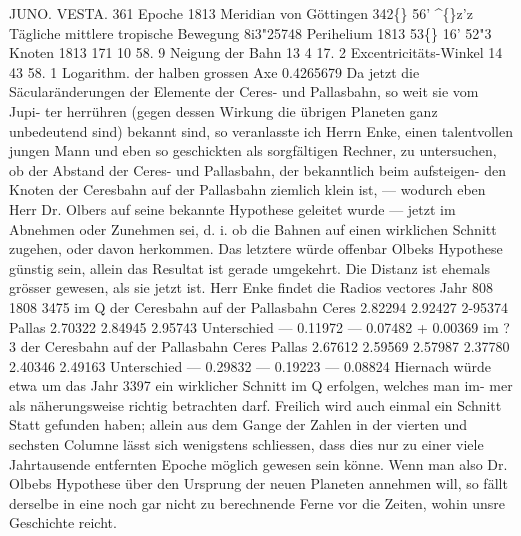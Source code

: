 \documentclass[12pt,a4paper]{article}
\newcommand{\degree}{\textdegree}
\begin{document}
\newpage
JUNO.      VESTA. 
361 
Epoche  1813  Meridian  von  Göttingen    342\degree\{\}  56'    \textasciicircum\{\}z'z 
Tägliche  mittlere  tropische  Bewegung    8i3"25748 
Perihelium  1813       
  53\degree\{\}  16'    52"3 
Knoten  1813    171     10    58. 9 
Neigung  der  Bahn    13      4     17. 2 
Excentricitäts-Winkel    14    43     58. 1 
Logarithm.  der  halben  grossen  Axe    0.4265679 
Da  jetzt  die  Säcularänderungen  der  Elemente  der  Ceres-  und  Pallasbahn,  so  weit  sie  vom  Jupi- 
ter herrühren  (gegen  dessen  Wirkung  die  übrigen  Planeten  ganz  unbedeutend  sind)  bekannt  sind,  so 
veranlasste  ich  Herrn  Enke,  einen  talentvollen  jungen  Mann  und  eben  so  geschickten  als  sorgfältigen 
Rechner,  zu  untersuchen,  ob  der  Abstand  der  Ceres-  und  Pallasbahn,  der  bekanntlich  beim  aufsteigen- 
den Knoten  der  Ceresbahn  auf  der  Pallasbahn  ziemlich  klein  ist,  ---  wodurch  eben  Herr  Dr.  Olbers 
auf  seine  bekannte  Hypothese  geleitet  wurde  ---  jetzt  im  Abnehmen  oder  Zunehmen  sei,  d.  i.  ob  die 
Bahnen  auf  einen  wirklichen  Schnitt  zugehen,  oder  davon  herkommen.  Das  letztere  würde  offenbar 
Olbeks  Hypothese  günstig  sein,  allein  das  Resultat  ist  gerade  umgekehrt.  Die  Distanz  ist  ehemals  grösser 
gewesen,  als  sie  jetzt  ist.    Herr  Enke  findet  die  Radios  vectores 
Jahr 
808 
1808 
3475 
im   Q   der  Ceresbahn  auf  der 
Pallasbahn 
Ceres 
2.82294 
2.92427 
2-95374 
Pallas 
2.70322 
2.84945 
2.95743 
Unterschied 
---  0.11972 
---  0.07482 
+  0.00369 
im   ?3   der  Ceresbahn  auf  der 
Pallasbahn 
Ceres 
Pallas 
2.67612 
2.59569 
2.57987 
2.37780 
2.40346 
2.49163 
Unterschied 
---  0.29832 
---  0.19223 
---  0.08824 
Hiernach  würde  etwa  um  das  Jahr  3397  ein  wirklicher  Schnitt  im  Q  erfolgen,  welches  man  im- 
mer als  näherungsweise  richtig  betrachten  darf.  Freilich  wird  auch  einmal  ein  Schnitt  Statt  gefunden 
haben;  allein  aus  dem  Gange  der  Zahlen  in  der  vierten  und  sechsten  Columne  lässt  sich  wenigstens 
schliessen,  dass  dies  nur  zu  einer  viele  Jahrtausende  entfernten  Epoche  möglich  gewesen  sein  könne. 
Wenn  man  also  Dr.  Olbebs  Hypothese  über  den  Ursprung  der  neuen  Planeten  annehmen  will,  so  fällt 
derselbe  in  eine  noch  gar  nicht  zu  berechnende  Ferne  vor  die  Zeiten,  wohin  unsre  Geschichte  reicht. 
\end{document}
